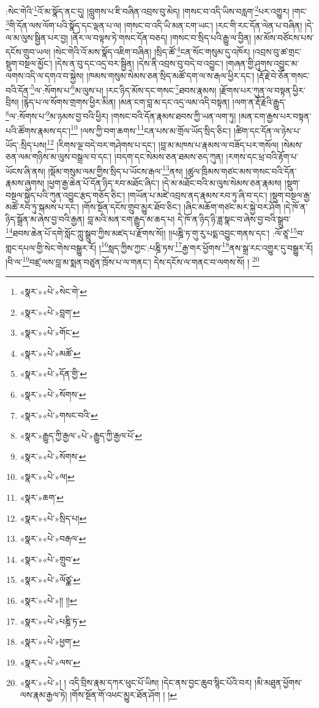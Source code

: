 :སེང་གེའི་\footnote{«སྣར་»«པེ་»སེང་གེ་}འོ་མ་སྣོད་ནང་དུ། །བླུགས་པ་ཇི་བཞིན་འབྲས་བུ་མེད། །གསང་བ་འདི་ཡིས་བརླག་\footnote{«སྣར་»«པེ་»བླག་}པར་འགྱུར། །གང་\footnote{«སྣར་»«པེ་»གོང་}གི་དོན་ལས་ལོག་པའི་སྣོད་དང་ལྡན་པ་ལ། །གསང་བ་འདི་ཡི་མན་ངག་ཡང་། །རང་གི་རང་དོན་ལེན་པ་བཞིན། །དེ་ལ་མ་ལུས་སྦྱིན་པར་བྱ། །ནོར་ལ་བལྟས་ཏེ་གསང་དོན་བཅད། །གསང་བ་སྲིད་པའི་རྒྱུ་ལ་བྱིན། །མ་མོས་བཙོངས་པས་དངོས་གྲུབ་ཡལ། །སེང་གེའི་འོ་མས་སྣོད་འཇིག་བཞིན། །སྲིད་ཚོ་\footnote{«སྣར་»«པེ་»མཚོ་}ངན་སོང་གསུམ་དུ་འཁོར། །འབྲས་བུ་ཚ་གྲང་སྡུག་བསྔལ་མྱོང་། །དེས་ན་བུ་དང་འདྲ་བར་སྦྱིན། །དེས་ནི་འབྲས་བུ་བདེ་བ་འབྱུང་། །གཞན་གྱི་ཤུགས་འབྱུང་མ་ལགས་འདི་ལ་དགའ་བ་སྐྱེས། །ཁམས་གསུམ་སེམས་ཅན་སྲིད་མཚོ་དག་ལ་ས་རྒལ་ཕྱིར་དང་། །རྡོ་རྗེ་བེ་ཅོན་གསང་བའི་དོན་\footnote{«སྣར་»«པེ་»དོན་གྱི་}ལ་:སོགས་པ་\footnote{«སྣར་»«པེ་»སོགས་}མ་ལུས་པ། །རང་ཉིད་མོས་དང་གསང་\footnote{«སྣར་»«པེ་»གསང་བའི་}ཐབས་རྣམས། །རྫོགས་པར་ཀུན་ལ་བསྟན་ཕྱིར་བྲིས། །རྙེད་པ་ལ་སོགས་གྲགས་ཕྱིར་མིན། །མན་ངག་བླ་མ་དང་འདྲ་ལམ་འདི་བསྟན། །ལག་ན་རྡོ་རྗེའི་རྒྱུད་\footnote{«སྣར་»རྒྱུད་ཀྱི་རྒྱལ་«པེ་»རྒྱུད་ཀྱི་རྒྱལ་པོ་}ལ་:སོགས་པ་\footnote{«སྣར་»«པེ་»སོགས་}མ་ཉམས་བྱ་བའི་ཕྱིར། །གསང་བའི་དོན་རྣམས་ཐབས་ཀྱི་ཡན་ལག་ཏུ། །མན་ངག་རྒྱས་པར་བསྟན་པའི་ཚོགས་རྣམས་དང་།\footnote{«སྣར་»«པེ་»ལ།} །ལས་ཀྱི་བག་ཆགས་\footnote{«སྣར་»ཆག་}ངན་པས་མ་གྲོལ་ཡོད་སྲིད་ཅིང་། །ཚིག་དང་དོན་ལ་ཉེས་པ་ཡོད་:སྲིད་པས།\footnote{«སྣར་»«པེ་»སྲིད་པ།} །རིགས་ལྔ་བདེ་བར་གཤེགས་པ་དང་། །བླ་མ་མཁས་པ་རྣམས་ལ་བཟོད་པར་གསོལ། །སེམས་ཅན་ལམ་གཉིས་མ་ལུས་བསྒྲལ་བ་དང་། །བདག་དང་སེམས་ཅན་ཐམས་ཅད་ཀུན། །རགས་དང་ཕྲ་བའི་རྟོག་པ་ཡོངས་ཞི་ནས། །སྡོམ་གསུམ་ལམ་གྱིས་སྲིད་པ་ཡོངས་རྒལ་\footnote{«སྣར་»«པེ་»བརྒལ་}ནས། །ཚུལ་ཁྲིམས་གཙང་མས་གསང་བའི་དོན་རྣམས་ཞུགས། །ཕྱག་རྒྱ་ཆེན་པོ་དོན་ཉིད་རབ་མཐོང་ཞིང་། །དེ་མ་མཐོང་བའི་མ་ལུས་སེམས་ཅན་རྣམས། །སྡུག་བསྔལ་སྐྱེད་པའི་ཀུན་འབྱུང་རྩད་གཅོད་ཅིང་། །གཡོན་པ་མཛེ་འབྲས་ནད་རྣམས་རབ་ཏུ་ཞི་བ་དང་། །སྡུག་བསྔལ་རྒྱ་མཚོ་རབ་ཏུ་སྐམས་པ་དང་། །གོས་སྔོན་དངོས་གྲུབ་མྱུར་ཐོབ་ཅིང་། །ཞིང་མཆོག་གཙང་མར་སྐྱེ་བར་ཤོག །དེ་ཁོ་ན་ཉིད་སྒྲོན་མ་ཞེས་བྱ་བའི་རྒྱན། བླ་མའི་མན་ངག་རྒྱུད་མ་ཆད་པ། དེ་ཁོ་ན་ཉིད་ཉི་ཟླ་སྣང་བ་ཞེས་བྱ་བའི་སྒྲུབ་\footnote{«སྣར་»«པེ་»གྲུབ་}ཐབས་ཆེན་པོ་དགེ་སློང་ཀླུ་སྒྲུབ་ཀྱིས་མཛད་པ་རྫོགས་སོ།། །།པཎྜི་ཏ་གུ་རུ་པདྨ་འབྱུང་གནས་དང་། :ལོ་ཙཱ་\footnote{«སྣར་»«པེ་»ལོཙྪ་}བ་གླང་དཔལ་གྱི་སེང་གེས་བསྒྱུར་རོ། །\footnote{«སྣར་»«པེ་»།། །།}སླད་ཀྱིས་ཀྱང་:པཎྜི་ཏས་\footnote{«སྣར་»«པེ་»པཎྜི་ཏ་}རྒྱ་གར་ཕྱོགས་\footnote{«སྣར་»«པེ་»ཕྱག་}ནས་སྒྲ་རང་འགྱུར་དུ་བསྒྱུར་རོ། །བི་ལ་\footnote{«སྣར་»«པེ་»ལས་}བཛྲ་ལས་བླ་མ་སྨན་བཙུན་ཁྲོས་པ་ལ་གནང་། དེས་དངོས་ལ་གནང་བ་ལགས་སོ། ། \footnote{«སྣར་»«པེ་»། ། འདི་བྲིས་རྣམ་དཀར་ཕུང་པོ་ཡིས། །དེང་ནས་བྱང་ཆུབ་སྙིང་པོའི་བར། །མི་མཐུན་ཕྱོགས་ལས་རྣམ་རྒྱལ་ཏེ། །གོས་སྔོན་གོ་འཕང་མྱུར་ཐོན་ཤོག ། །}